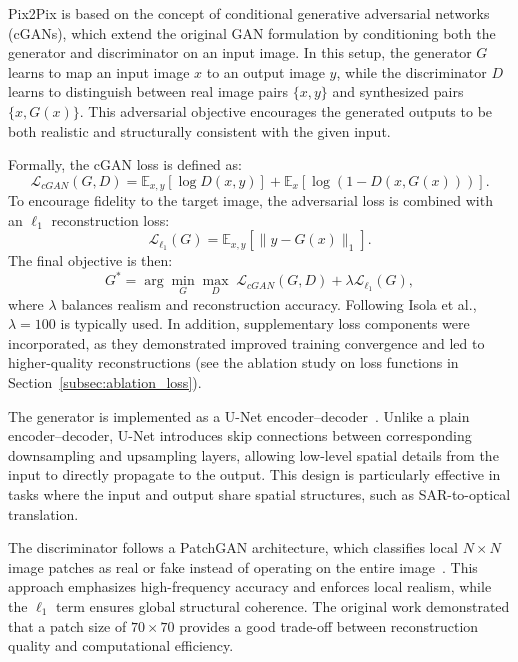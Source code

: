 Pix2Pix is based on the concept of conditional generative adversarial networks (cGANs), which extend the original GAN formulation by conditioning both the generator and discriminator on an input image. In this setup, the generator $G$ learns to map an input image $x$ to an output image $y$, while the discriminator $D$ learns to distinguish between real image pairs $\{x, y\}$ and synthesized pairs $\{x, G(x)\}$. This adversarial objective encourages the generated outputs to be both realistic and structurally consistent with the given input.


Formally, the cGAN loss is defined as:
\begin{equation}
    \mathcal{L}_{cGAN}(G,D) = \mathbb{E}_{x,y}[\log D(x,y)] + \mathbb{E}_{x}[\log(1 - D(x,G(x)))].
\end{equation}
To encourage fidelity to the target image, the adversarial loss is combined with an $\ell_{1}$ reconstruction loss:
\begin{equation}
    \mathcal{L}_{\ell_1}(G) = \mathbb{E}_{x,y}[\|y - G(x)\|_1].
\end{equation}
The final objective is then:
\begin{equation}
    G^* = \arg \min_G \max_D \; \mathcal{L}_{cGAN}(G,D) + \lambda \mathcal{L}_{\ell_1}(G),
\end{equation}
where $\lambda$ balances realism and reconstruction accuracy. Following Isola et al., $\lambda = 100$ is typically used. In addition, supplementary loss components were incorporated, as they demonstrated improved training convergence and led to higher-quality reconstructions (see the ablation study on loss functions in Section~\ref{subsec:ablation_loss}).

The generator is implemented as a U-Net encoder–decoder~\cite{U-net_2015}. Unlike a plain encoder–decoder, U-Net introduces skip connections between corresponding downsampling and upsampling layers, allowing low-level spatial details from the input to directly propagate to the output. This design is particularly effective in tasks where the input and output share spatial structures, such as SAR-to-optical translation.

The discriminator follows a PatchGAN architecture, which classifies local $N \times N$ image patches as real or fake instead of operating on the entire image~\cite{pix2pix_2018}. This approach emphasizes high-frequency accuracy and enforces local realism, while the $\ell_1$ term ensures global structural coherence. The original work demonstrated that a patch size of $70 \times 70$ provides a good trade-off between reconstruction quality and computational efficiency.

